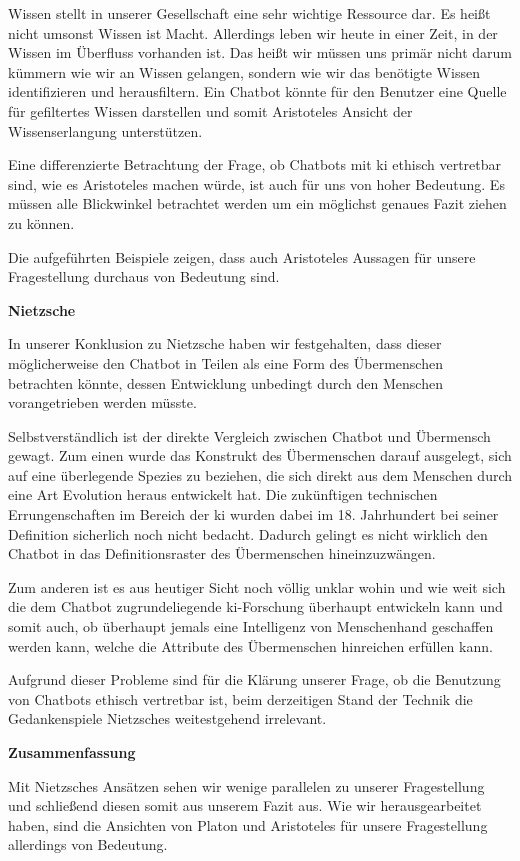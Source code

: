 Wissen stellt in unserer Gesellschaft eine sehr wichtige Ressource dar. Es heißt nicht umsonst \glqq Wissen ist Macht\grqq. Allerdings leben wir heute in einer Zeit, in der Wissen im Überfluss vorhanden ist. 
Das heißt wir müssen uns primär nicht darum kümmern wie wir an Wissen gelangen, sondern wie wir das benötigte Wissen identifizieren und herausfiltern.
Ein Chatbot könnte für den Benutzer eine Quelle für gefiltertes Wissen darstellen und somit Aristoteles Ansicht der Wissenserlangung unterstützen.

Eine differenzierte Betrachtung der Frage, ob Chatbots mit \ac{ki} ethisch vertretbar sind, wie es Aristoteles machen würde, ist auch für uns von hoher Bedeutung. Es müssen alle Blickwinkel betrachtet werden um ein möglichst genaues Fazit ziehen zu können.
 
Die aufgeführten Beispiele zeigen, dass auch Aristoteles Aussagen für unsere Fragestellung durchaus von Bedeutung sind. 

\textbf{Nietzsche}

In unserer Konklusion zu Nietzsche haben wir festgehalten, dass dieser möglicherweise den Chatbot in Teilen als eine Form des Übermenschen betrachten könnte, dessen Entwicklung unbedingt durch den Menschen vorangetrieben werden müsste.

Selbstverständlich ist der direkte Vergleich zwischen Chatbot und Übermensch gewagt.
Zum einen wurde das Konstrukt des Übermenschen darauf ausgelegt, sich auf eine überlegende Spezies zu beziehen, die sich direkt aus dem Menschen durch eine Art Evolution heraus entwickelt hat.
Die zukünftigen technischen Errungenschaften im Bereich der \ac{ki} wurden dabei im 18. Jahrhundert bei seiner Definition sicherlich noch nicht bedacht.   
Dadurch gelingt es nicht wirklich den Chatbot in das Definitionsraster des Übermenschen hineinzuzwängen.

Zum anderen ist es aus heutiger Sicht noch völlig unklar wohin und wie weit sich die dem Chatbot zugrundeliegende \ac{ki}-Forschung überhaupt entwickeln kann und somit auch, ob überhaupt jemals eine Intelligenz von Menschenhand geschaffen werden kann, welche die Attribute des Übermenschen hinreichen erfüllen kann.

Aufgrund dieser Probleme sind für die Klärung unserer Frage, ob die Benutzung von Chatbots ethisch vertretbar ist, beim derzeitigen Stand der Technik die Gedankenspiele Nietzsches weitestgehend irrelevant.


\textbf{Zusammenfassung}

Mit Nietzsches Ansätzen sehen wir wenige parallelen zu unserer Fragestellung und schließend diesen somit aus unserem Fazit aus. Wie wir herausgearbeitet haben, sind die Ansichten von Platon und Aristoteles für unsere Fragestellung allerdings von Bedeutung. 

